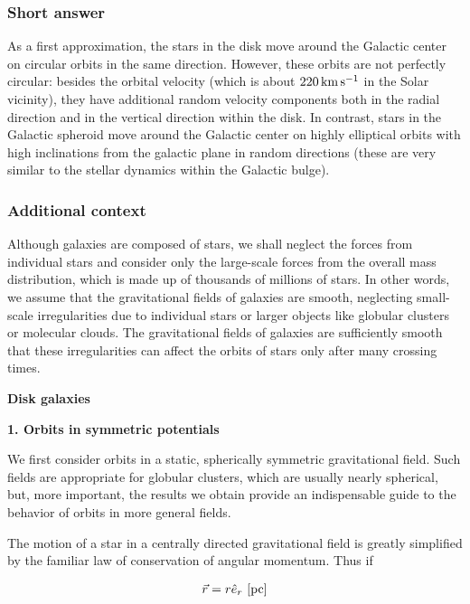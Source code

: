\documentclass[a4paper,10pt]{article}
\begin{document}
\subsubsection{Short answer}

As a first approximation, the stars in the disk move around the Galactic center on circular orbits in the same direction. However, these orbits are not perfectly circular: besides the orbital velocity (which is about $220\,{\rm km\,s^{-1}}$ in the Solar vicinity), they have additional random velocity components both in the radial direction and in the vertical direction within the disk. In contrast, stars in the Galactic spheroid move around the Galactic center on highly elliptical orbits with high inclinations from the galactic plane in random directions (these are very similar to the stellar dynamics within the Galactic bulge).

\subsubsection{Additional context}

Although galaxies are composed of stars, we shall neglect the forces from individual stars and consider only the large-scale forces from the overall mass distribution, which is made up of thousands of millions of stars. In other words, we assume that the gravitational fields of galaxies are smooth, neglecting small-scale irregularities due to individual stars or larger objects like globular clusters or molecular clouds. The gravitational fields of galaxies are sufficiently smooth that these irregularities can affect the orbits of stars only after many crossing times.

{\noindent}\textbf{Disk galaxies}

{\noindent}\textbf{1. Orbits in symmetric potentials} 

{\noindent}We first consider orbits in a static, spherically symmetric gravitational field. Such fields are appropriate for globular clusters, which are usually nearly spherical, but, more important, the results we obtain provide an indispensable guide to the behavior of orbits in more general fields.

{\noindent}The motion of a star in a centrally directed gravitational field is greatly simplified by the familiar law of conservation of angular momentum. Thus if

\begin{align*}
    \vec{r} = r\hat{e}_r ~ [{\rm pc}]
\end{align*}
\end{document}
